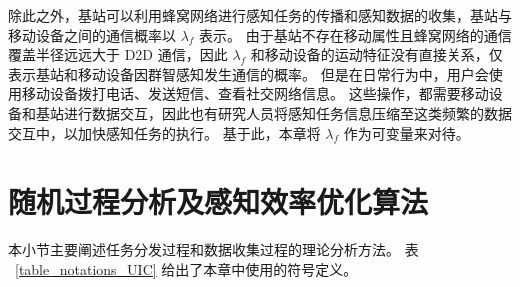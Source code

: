 除此之外，基站可以利用蜂窝网络进行感知任务的传播和感知数据的收集，基站与移动设备之间的通信概率以 $\lambda_f$ 表示。
由于基站不存在移动属性且蜂窝网络的通信覆盖半径远远大于 D2D 通信，因此 $\lambda_f$ 和移动设备的运动特征没有直接关系，仅表示基站和移动设备因群智感知发生通信的概率。
但是在日常行为中，用户会使用移动设备拨打电话、发送短信、查看社交网络信息。
这些操作，都需要移动设备和基站进行数据交互，因此也有研究人员将感知任务信息压缩至这类频繁的数据交互中，以加快感知任务的执行。
基于此，本章将 $\lambda_f$ 作为可变量来对待。


\section{随机过程分析及感知效率优化算法}
本小节主要阐述任务分发过程和数据收集过程的理论分析方法。
表 ~\ref{table_notations_UIC} 给出了本章中使用的符号定义。

